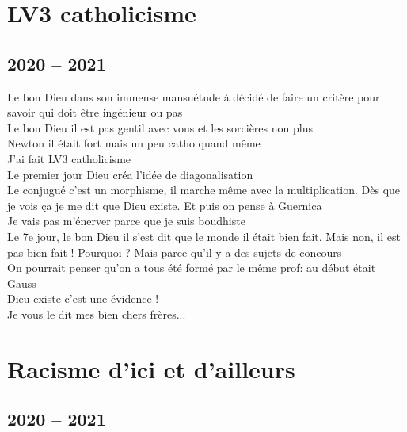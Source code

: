 \documentclass[french, a4paper, openany]{book}
\begin{document}
\chapter{LV3 catholicisme} 

\section{2020 -- 2021}
 
	\noindent \og Le bon Dieu dans son immense mansuétude à décidé de faire un critère pour savoir qui doit être ingénieur ou pas \fg \\
	\og Le bon Dieu il est pas gentil avec vous et les sorcières non plus \fg \\
	\og Newton il était fort mais un peu catho quand même \fg \\
	\og J'ai fait LV3 catholicisme \fg \\
	\og Le premier jour Dieu créa l'idée de diagonalisation \fg \\
	\og Le conjugué c'est un morphisme, il marche même avec la multiplication. Dès que je vois ça je me dit que Dieu existe. Et puis on pense à Guernica \fg \\
	\og Je vais pas m'énerver parce que je suis boudhiste \fg \\
	\og Le 7e jour, le bon Dieu il s'est dit que le monde il était bien fait. Mais non, il est pas bien fait ! Pourquoi ? Mais parce qu'il y a des sujets de concours \fg \\
	\og On pourrait penser qu'on a tous été formé par le même prof: au début était Gauss \fg \\
	\og Dieu existe c'est une évidence ! \fg \\
	\og Je vous le dit mes bien chers frères... \fg \\

\chapter{Racisme d'ici et d'ailleurs}

\section{2020 -- 2021}
\end{document}
